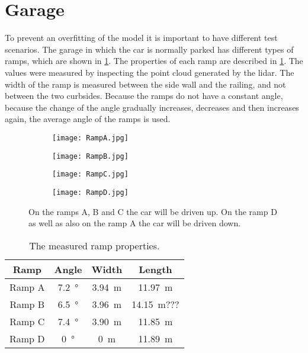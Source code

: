 \section{Garage}
\label{sec:garage}
To prevent an overfitting of the model it is important to have different test scenarios.
The garage in which the car is normally parked has different types of ramps, which are shown in \cref{fig:all_ramps}.
The properties of each ramp are described in \cref{tab:ramp_properties}.
The values were measured by inspecting the point cloud generated by the \gls{lidar}.
The width of the ramp is measured between the side wall and the railing, and not between the two curbsides.
Because the ramps do not have a constant angle, because the change of the angle gradually increases, decreases and then increases again, the average angle of the ramps is used.
\begin{figure}[htb]
	\begin{subfigure}{.24\linewidth}
		\centering
		\texttt{[image: RampA.jpg]}
		\caption{}
	\end{subfigure}
	\hfill
	\begin{subfigure}{.24\linewidth}
		\centering
		\texttt{[image: RampB.jpg]}
		\caption{}
	\end{subfigure}
	\hfill
	\begin{subfigure}{.24\linewidth}
		\centering
		\texttt{[image: RampC.jpg]}
		\caption{}
	\end{subfigure}
	\hfill
	\begin{subfigure}{.24\linewidth}
		\centering
		\texttt{[image: RampD.jpg]}
		\caption{}
	\end{subfigure}
	\caption[Ramps of the garage]{On the ramps A, B and C the car will be driven up. On the ramp D as well as also on the ramp A the car will be driven down.}
	\label{fig:all_ramps}
\end{figure}
\begin{table}[htb]
	\centering
	\caption[Measured ramp properties]{The measured ramp properties.}
	\label{tab:ramp_properties}
	\begin{tabular}[t]{cccc}
		\toprule
		\textbf{Ramp} & \textbf{Angle}    & \textbf{Width}    & \textbf{Length}       \\
		\midrule
		Ramp A        & \SI{7.2}{\degree} & \SI{3.94}{\metre} & \SI{11.97}{\metre}    \\
		Ramp B        & \SI{6.5}{\degree} & \SI{3.96}{\metre} & \SI{14.15}{\metre}??? \\
		Ramp C        & \SI{7.4}{\degree} & \SI{3.90}{\metre} & \SI{11.85}{\metre}    \\
		Ramp D        & \SI{0}{\degree}   & \SI{0}{\metre}    & \SI{11.89}{\metre}    \\
		\bottomrule
	\end{tabular}
\end{table}